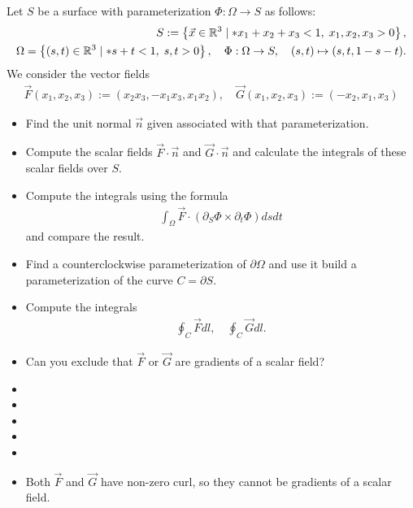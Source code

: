 \documentclass[11pt]{article}
\begin{document}
\begin{exercise}
    Let $S$ be a surface with parameterization $\Phi : \Omega \to S$ as follows:
    \begin{align}
     S := \left\{ \vec x \in \bbR^3 \suchthat* x_1 + x_2 + x_3 < 1, \; x_1, x_2, x_3 > 0 \right\},
     \\
     \Omega = \left\{ (s,t) \in \bbR^3 \suchthat* s + t < 1, \; s, t > 0 \right\},
     \quad 
     \Phi : \Omega \to S, \quad (s,t) \mapsto (s,t,1-s-t).
    \end{align}
    We consider the vector fields 
    \begin{align}
        \vec F(x_1,x_2,x_3) := (x_2 x_3, -x_1 x_3, x_1 x_2), \quad \vec G(x_1,x_2,x_3) := (-x_2, x_1,x_3)
    \end{align}
    \begin{itemize}
     \item
     Find the unit normal $\vec n$ given associated with that parameterization.
     \item
     Compute the scalar fields $\vec F \cdot \vec n$ and $\vec G \cdot \vec n$ and calculate the integrals of these scalar fields over $S$.
     \item
     Compute the integrals using the formula 
     \begin{align}
        \int_\Omega \vec F \cdot ( \partial_S \Phi \times \partial_t \Phi ) dsdt
     \end{align}
     and compare the result. 
     \item 
     Find a counterclockwise parameterization of $\partial\Omega$ and use it build a parameterization of the curve $C = \partial S$.
     \item 
     Compute the integrals 
     \begin{align}
        \oint_C \vec F dl, \quad \oint_C \vec G dl.
     \end{align}
     \item 
     Can you exclude that $\vec F$ or $\vec G$ are gradients of a scalar field?
    \end{itemize}
\end{exercise}
\begin{solution}     
    \begin{itemize}
     \item
     \item
     \item
     \item 
     \item 
     \item 
     Both $\vec F$ and $\vec G$ have non-zero curl, so they cannot be gradients of a scalar field. 
    \end{itemize}
\end{solution}
\end{document}
